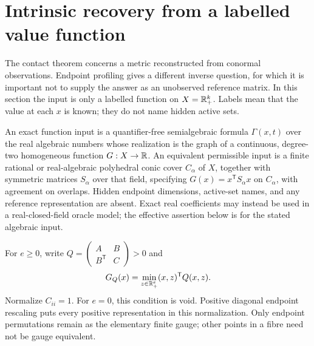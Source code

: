\section{Intrinsic recovery from a labelled value function}\label{sec:intrinsic-fibres}
The contact theorem concerns a metric reconstructed from conormal observations. Endpoint profiling gives a different inverse question, for which it is important not to supply the answer as an unobserved reference matrix. In this section the input is only a labelled function on $X=\mathbb R_+^k$. Labels mean that the value at each $x$ is known; they do not name hidden active sets.

\begin{definition}\label{def:exact-function}
An exact function input is a quantifier-free semialgebraic formula $\Gamma(x,t)$ over the real algebraic numbers whose realization is the graph of a continuous, degree-two homogeneous function $G:X\to\mathbb R$. An equivalent permissible input is a finite rational or real-algebraic polyhedral conic cover $C_\alpha$ of $X$, together with symmetric matrices $S_\alpha$ over that field, specifying $G(x)=x^{\mathsf T}S_\alpha x$ on $C_\alpha$, with agreement on overlaps. Hidden endpoint dimensions, active-set names, and any reference representation are absent. Exact real coefficients may instead be used in a real-closed-field oracle model; the effective assertion below is for the stated algebraic input.
\end{definition}

For $e\ge0$, write $Q=\left(\begin{smallmatrix}A&B\\B^{\mathsf T}&C\end{smallmatrix}\right)>0$ and
\[
 G_Q(x)=\min_{z\in\mathbb R_+^e}(x,z)^{\mathsf T}Q(x,z).
\]
Normalize $C_{ii}=1$. For $e=0$, this condition is void. Positive diagonal endpoint rescaling puts every positive representation in this normalization. Only endpoint permutations remain as the elementary finite gauge; other points in a fibre need not be gauge equivalent.

